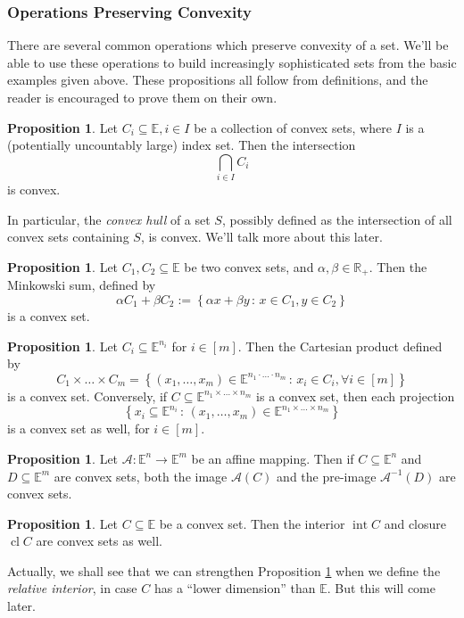 \documentclass{article}
\numberwithin{equation}{section}
\theoremstyle{definition}
\newtheorem{proposition}[theorem]{Proposition}
\newcommand{\bE}{\mathbb{E}}
\newcommand{\bR}{\mathbb{R}}
\newcommand{\cA}{\mathcal{A}}
\newcommand{\set}[2]{\left\{#1\,:\,#2\right\}}
\newcommand{\scl}{\operatorname{cl}}
\newcommand{\sint}{\operatorname{int}}
\begin{document}
\subsubsection{Operations Preserving Convexity}
There are several common operations which preserve convexity of a set. We'll be able to use these operations to build increasingly sophisticated sets from the basic examples given above. 
These propositions all follow from definitions, and the reader is encouraged to prove them on their own.
\begin{proposition}
    \label{propcvxintersection}
    Let $C_i\subseteq\bE, i\in I$ be a collection of convex sets, where $I$ is a (potentially uncountably large) index set. Then the intersection
    \begin{equation}
        \bigcap_{i\in I} C_i
    \end{equation}
    is convex.
\end{proposition}
In particular, the \textit{convex hull} of a set $S$, possibly defined as the intersection of all convex sets containing $S$, is convex. We'll talk more about this later.
\begin{proposition}
    Let $C_1, C_2\subseteq\bE$ be two convex sets, and $\alpha,\beta\in\bR_+$. Then the Minkowski sum, defined by
    \begin{equation}
        \alpha C_1+\beta C_2:=\set{\alpha x+\beta y}{x\in C_1, y\in C_2}
    \end{equation}
    is a convex set.
\end{proposition}
\begin{proposition}
    Let $C_i\subseteq\bE^{n_i}$ for $i\in[m]$. Then the Cartesian product defined by
    \begin{equation}
        C_1\times\dots\times C_m=\set{(x_1, \dots, x_m)\in\bE^{n_1\cdot\dots\cdot n_m}}{x_i\in C_i, \forall i\in[m]}
    \end{equation}
    is a convex set. Conversely, if $C\subseteq\bE^{{n_1}\times\dots\times{n_m}}$ is a convex set, then each projection
    \begin{equation}
        \set{x_i\subseteq\bE^{n_i}}{(x_1,\dots, x_m)\in\bE^{n_1\times\dots\times n_m}}
    \end{equation}
    is a convex set as well, for $i\in [m]$.
\end{proposition}
\begin{proposition}
    Let $\cA:\bE^n\to\bE^m$ be an affine mapping. Then if $C\subseteq\bE^n$ and $D\subseteq\bE^m$ are convex sets, both the image $\cA(C)$ and the pre-image $\cA^{-1}(D)$ are convex sets.
\end{proposition}
\begin{proposition}
    \label{prpconvexintcl}
    Let $C\subseteq\bE$ be a convex set. Then the interior $\sint C$ and closure $\scl C$ are convex sets as well.
\end{proposition}
Actually, we shall see that we can strengthen Proposition \ref{prpconvexintcl} when we define the \textit{relative interior}, in case $C$ has a ``lower dimension'' than $\bE$. But this will come later.
\end{document}
